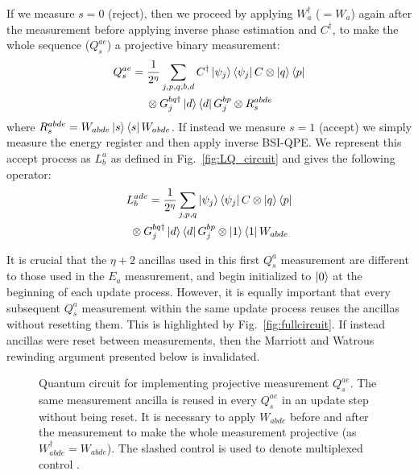\documentclass[aps,floatfix,10pt,amssymb,amsfont,amsmath,superscriptaddress,float,nofootinbib,longbibliography,nobalancelastpage,twocolumn]{revtex4-2}
\begin{document}
If we measure $s=0$ (reject), then we proceed by applying $W_{a}^{\dagger}$ ($=W_a$) again after the measurement before applying inverse phase estimation and $C^{\dagger}$, to make the whole sequence ($Q_s^{ae}$) a projective binary measurement:
\begin{multline}
    Q_s^{ae} = \frac{1}{2^{\eta}}\sum_{j,p,q,b,d}
    C^{\dagger}\ket{\psi_j}\bra{\psi_j}C \otimes \ket{q}\bra{p}\\
    {}\otimes G_j^{bq\dagger}\ket{d}\bra{d}G_j^{bp}\otimes R^{abde}_s
\end{multline}
where $R^{abde}_s = W_{abde}\ket{s}\bra{s}W_{abde}$. If instead we measure $s=1$ (accept) we simply measure the energy register and then apply inverse BSI-QPE. We represent this accept process as $L^a_b$ as defined in Fig.~\ref{fig:LQ_circuit} and gives the following operator:
\begin{multline}
    L^{ade}_b = \frac{1}{2^{\eta}}\sum_{j,p,q}
    \ket{\psi_j}\bra{\psi_j}C \otimes \ket{q}\bra{p}\\
    {}\otimes G^{bq\dagger}_j \ket{d}\bra{d}G^{bp}_j
    \otimes \ket{1}\bra{1}W_{abde}
\end{multline}

It is crucial that the $\eta+2$ ancillas used in this first $Q^a_s$ measurement are different to those used in the $E_a$ measurement, and begin initialized to $\ket{0}$ at the beginning of each update process. However, it is equally important that every subsequent $Q_s^a$ measurement within the same update process reuses the ancillas without resetting them. This is highlighted by Fig.~\ref{fig:fullcircuit}. If instead ancillas were reset between measurements, then the Marriott and Watrous rewinding argument presented below is invalidated.
\begin{figure}

\caption{Quantum circuit for implementing projective measurement $Q_s^{ae}$. The same measurement ancilla is reused in every $Q_s^{ae}$ in an update step without being reset. It is necessary to apply $W_{abde}$ before and after the measurement to make the whole measurement projective (as $W_{abde}^{\dagger} = W_{abde}$). The slashed control is used to denote multiplexed control \cite{low2024trading}.}
\label{fig:Qcircuit}
\end{figure}
\end{document}
